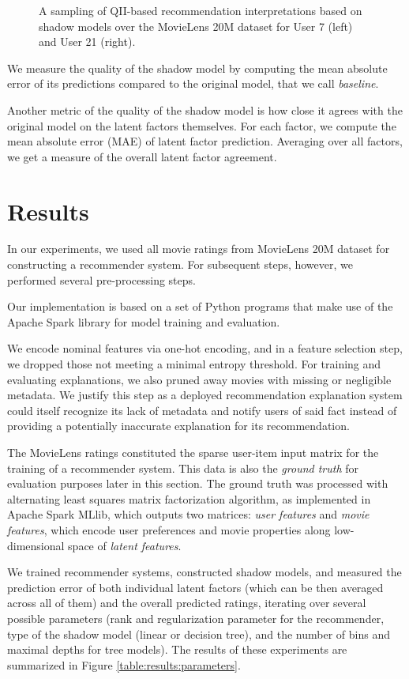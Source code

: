 \begin{figure}[t!]
  \caption{\label{fig:results:qii}A sampling of QII-based
    recommendation interpretations based on shadow models over the
    MovieLens 20M dataset for User 7 (left) and User 21 (right).
  }
\end{figure}


We measure the quality of the shadow model by computing the mean
absolute error of its predictions compared to the original model,
that we call \emph{baseline}.

Another metric of the quality of the shadow model is how close it
agrees with the original model on the latent factors themselves.
For each factor, we compute the mean absolute error (MAE) of latent
factor prediction. 
Averaging over all factors, we get a measure of the overall latent
factor agreement.

\section{Results}

In our experiments, we used all movie ratings from MovieLens 20M dataset for constructing
a recommender system. 
For subsequent steps, however, we performed several pre-processing
steps.

Our implementation is based on a set of Python programs that make use
of the Apache Spark library for model training and evaluation.

We encode nominal features via one-hot encoding, and in a feature
selection step, we dropped those not meeting a minimal entropy
threshold.
For training and evaluating explanations, we also pruned away movies
with missing or negligible metadata. 
We justify this step as a deployed recommendation explanation system
could itself recognize its lack of metadata and notify users of said
fact instead of providing a potentially inaccurate explanation for its
recommendation.

The MovieLens ratings constituted the sparse user-item input matrix
for the training of a recommender system.
This data is also the \emph{ground truth} for evaluation purposes
later in this section.
The ground truth was processed with alternating least squares matrix
factorization algorithm, as implemented in Apache Spark MLlib, which
outputs two matrices: \emph{user features} and \emph{movie features},
which encode user preferences and movie properties along
low-dimensional space of \emph{latent features}. 

We trained recommender systems, constructed shadow models, and
measured the prediction error of both individual
latent factors (which can be then averaged across all of them)
and the overall predicted ratings, iterating over
several possible parameters (rank and regularization parameter for the
recommender, type of the shadow model (linear or decision tree), and
the number of bins and maximal depths for tree models). The results of
these experiments are summarized in Figure
\ref{table:results:parameters}.

